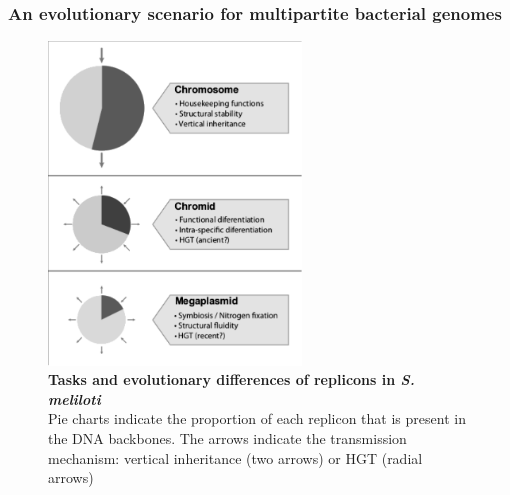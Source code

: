 \subsubsection{An evolutionary scenario for multipartite bacterial genomes}
\begin{figure}[!tb]
	\center
    \includegraphics[width=0.6\textwidth]{figures/4/thesis_35}
	\caption{\label{fig:replicons}\textbf{Tasks and evolutionary differences of replicons in \textit{S. meliloti}}\\
	Pie charts indicate the proportion of each replicon that is present in the DNA backbones. The arrows indicate the transmission mechanism: vertical inheritance (two arrows) or HGT (radial arrows)}
\end{figure}

